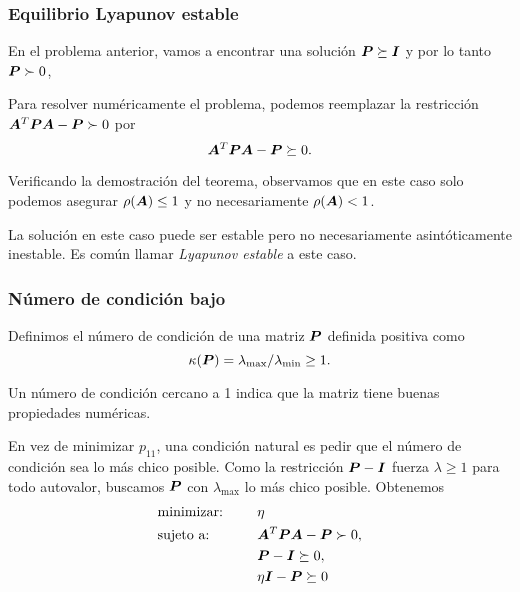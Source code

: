 \documentclass[aspectratio=169,12pt,spanish]{beamer}
\begin{document}

\begin{frame}
\frametitle{Equilibrio Lyapunov estable}

En el problema anterior, vamos a encontrar una solución $\bm{P} \succeq \bm{I}$ y por lo tanto $\bm{P} \succ 0$,

Para resolver numéricamente el problema, podemos reemplazar la restricción $\bm{A}^T \bm{P} \bm{A} - \bm{P} \succ 0$ por
$$\bm{A}^T \bm{P} \bm{A} - \bm{P} \succeq 0.$$

Verificando la demostración del teorema, observamos que en este caso solo podemos asegurar $\rho(\bm{A})  \le 1$ y no necesariamente $\rho(\bm{A})<1$.

La solución en este caso puede ser estable pero no necesariamente asintóticamente inestable. Es común llamar \emph{Lyapunov estable} a este caso.

\end{frame}


\begin{frame}
\frametitle{Número de condición bajo}

Definimos el número de condición de una matriz $\bm{P}$ definida positiva como
$$\kappa(\bm{P}) = \lambda_{\max} / \lambda_{\min} \ge 1.$$

Un número de condición cercano a 1 indica que la matriz tiene buenas propiedades numéricas.

En vez de minimizar $p_{11}$, una condición natural es pedir que el número de condición sea lo más chico posible. Como la restricción $\bm{P} - \bm{I}$ fuerza $\lambda \ge 1$ para todo autovalor, buscamos $\bm{P}$ con $\lambda_{\max}$ lo más chico posible.
Obtenemos
\begin{alignat*}{2}
  & \text{minimizar: } & & \eta \\
   & \text{sujeto a: } & \quad & \bm{A}^T \bm{P} \bm{A} - \bm{P} \succ 0, \\
   &&& \bm{P} - \bm{I} \succeq 0, \\
   &&& \eta \bm{I} - \bm{P} \succeq 0
\end{alignat*}



\end{frame}

\end{document}
